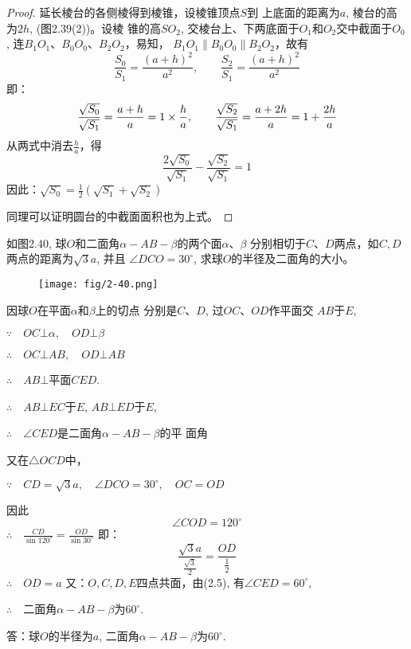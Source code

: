 \begin{proof}
    延长棱台的各侧棱得到棱锥，设棱锥顶点$S$到
    上底面的距离为$a$, 棱台的高为$2h$, (图2.39(2))。设棱
    锥的高$SO_2$, 交棱台上、下两底面于$O_1$和$O_2$交中截面于$O_0$,
    连$B_1O_1$、$B_0O_0$、$B_2O_2$，易知，
$B_1O_1\parallel B_0O_0\parallel B_2O_2$，故有
\[\frac{S_0}{S_1}=\frac{(a+h)^2}{a^2},\qquad \frac{S_2}{S_1}=\frac{(a+h)^2}{a^2}\]
即：
\[\dfrac{\sqrt{S_0}}{\sqrt{S_1}}=\dfrac{a+h}{a}=1\times \dfrac{h}{a},\qquad \dfrac{\sqrt{S_2}}{\sqrt{S_1}}=\dfrac{a+2h}{a}=1+\dfrac{2h}{a}\]
从两式中消去$\frac{h}{a}$，得
\[\frac{2\sqrt{S_0}}{\sqrt{S_1}}-\frac{\sqrt{S_2}}{\sqrt{S_1}}=1\]
因此：$\sqrt{S_0}=\frac{1}{2}\left(\sqrt{S_1}+\sqrt{S_2}\right)$

同理可以证明圆台的中截面面积也为上式。
\end{proof}


\begin{example}
    如图2.40, 球$O$和二面角$\alpha-AB-\beta$的两个面$\alpha$、$\beta$
分别相切于$C$、$D$两点，如$C,D$两点的距离为$\sqrt{3}a$, 并且
$\angle DCO=30^{\circ}$, 求球$O$的半径及二面角的大小。
\end{example}

\begin{figure}[htp]
    \centering
 \texttt{[image: fig/2-40.png]}   
    \caption{}
\end{figure}

\begin{solution}
    因球$O$在平面$\alpha$和$\beta$上的切点
分别是$C$、$D$, 过$OC$、$OD$作平面交
$AB$于$E$,

$\because\quad OC\bot\alpha,\quad OD\bot\beta$

$\therefore\quad OC\bot AB,\quad OD\bot AB$

$\therefore\quad AB\bot$平面$CED$.

$\therefore\quad AB\bot EC$于$E$, $AB\bot ED$于$E$,

$\therefore\quad \angle CED$是二面角$\alpha-AB-\beta$的平
面角

又在$\triangle OCD$中，

$\because\quad CD=\sqrt{3}a,\quad \angle DCO=30^{\circ},\quad 
OC=OD$

因此
\begin{equation}
    \angle COD=120^{\circ}
\end{equation}
$\therefore\quad \frac{CD}{\sin120^{\circ}}=\frac{OD}{\sin30^{\circ}}$
即：
\[\frac{\sqrt{3}a}{\frac{\sqrt{3}}{2}}=\frac{OD}{\frac{1}{2}}\]
$\therefore\quad OD=a$
又：$O,C,D,E$四点共面，由(2.5), 有$\angle CED=60^{\circ}$,

$\therefore\quad $二面角$\alpha-AB-\beta$为$60^{\circ}$.

答：球$O$的半径为$a$, 二面角$\alpha-AB-\beta$为$60^{\circ}$.
\end{solution}


